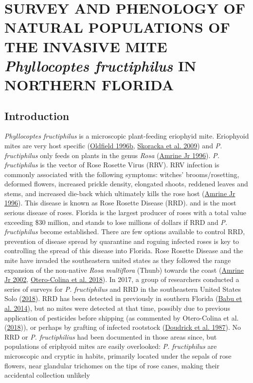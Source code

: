 \documentclass{ufdissertation}[overrideChapters] %
\begin{document}
{{\chapter{\texorpdfstring{SURVEY AND PHENOLOGY OF NATURAL POPULATIONS OF THE INVASIVE MITE \emph{Phyllocoptes fructiphilus} IN NORTHERN FLORIDA}{SURVEY AND PHENOLOGY OF NATURAL POPULATIONS OF THE INVASIVE MITE Phyllocoptes fructiphilus IN NORTHERN FLORIDA}}\label{survey-and-phenology-of-natural-populations-of-the-invasive-mite-phyllocoptes-fructiphilus-in-northern-florida}}

\hypertarget{introduction}{%
\section{Introduction}\label{introduction}}

\emph{Phyllocoptes fructiphilus} is a microscopic plant-feeding eriophyid mite. Eriophyoid mites are very host specific (\protect\hyperlink{ref-Oldfield1996c}{Oldfield 1996b}, \protect\hyperlink{ref-Skoracka2009}{Skoracka et al. 2009}) and \emph{P. fructiphilus} only feeds on plants in the genus \emph{Rosa} (\protect\hyperlink{ref-Amrine1996}{Amrine Jr 1996}). \emph{P. fructiphilus} is the vector of Rose Rosette Virus (RRV). RRV infection is commonly associated with the following symptoms: witches' brooms/rosetting, deformed flowers, increased prickle density, elongated shoots, reddened leaves and stems, and increased die-back which ultimately kills the rose host (\protect\hyperlink{ref-Amrine1996}{Amrine Jr 1996}). This disease is known as Rose Rosette Disease (RRD). and is the most serious disease of roses. Florida is the largest producer of roses with a total value exceeding \$30 million, and stands to lose millions of dollars if RRD and \emph{P. fructiphilus} become established. There are few options available to control RRD, prevention of disease spread by quarantine and roguing infected roses is key to controlling the spread of this disease into Florida. Rose Rosette Disease and the mite have invaded the southeastern united states as they followed the range expansion of the non-native \emph{Rosa multiflora} (Thunb) towards the coast (\protect\hyperlink{ref-Amrine2002}{Amrine Jr 2002}, \protect\hyperlink{ref-Otero-Colina2018}{Otero-Colina et al. 2018}). In 2017, a group of researchers conducted a series of surveys for \emph{P. fructiphilus} and RRD in the southeastern United States Solo (\protect\hyperlink{ref-Solo2018}{2018}). RRD has been detected in previously in southern Florida (\protect\hyperlink{ref-Babu2014}{Babu et al. 2014}), but no mites were detected at that time, possibly due to previous application of pesticides before shipping (as commented by Otero-Colina et al. (\protect\hyperlink{ref-Otero-Colina2018}{2018})), or perhaps by grafting of infected rootstock (\protect\hyperlink{ref-Doudrick1987}{Doudrick et al. 1987}). No RRD or \emph{P. fructiphilius} had been documented in those areas since, but populations of eriphyoid mites are easily overlooked: \emph{P. fructiphilus} are microscopic and cryptic in habits, primarily located under the sepals of rose flowers, near glandular trichomes on the tips of rose canes, making their accidental collection unlikely }
\end{document}
